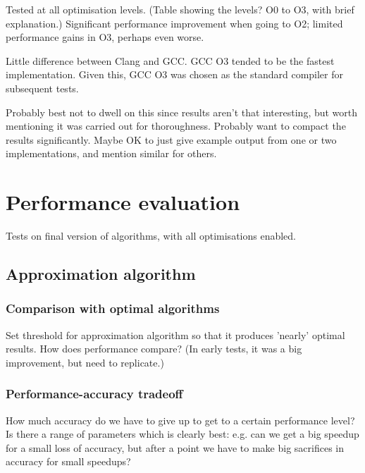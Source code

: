 Tested at all optimisation levels. (Table showing the levels? O0 to O3, with brief explanation.) Significant performance improvement when going to O2; limited performance gains in O3, perhaps even worse.

Little difference between Clang and GCC. GCC O3 tended to be the fastest implementation. Given this, GCC O3 was chosen as the standard compiler for subsequent tests.

Probably best not to dwell on this since results aren't that interesting, but worth mentioning it was carried out for thoroughness. Probably want to compact the results significantly. Maybe OK to just give example output from one or two implementations, and mention similar for others.

\section{Performance evaluation}

Tests on final version of algorithms, with all optimisations enabled.

\subsection{Approximation algorithm} \label{sec:eval-approx}


\subsubsection{Comparison with optimal algorithms}

Set threshold for approximation algorithm so that it produces 'nearly' optimal results. How does performance compare? (In early tests, it was a big improvement, but need to replicate.)

\subsubsection{Performance-accuracy tradeoff}

How much accuracy do we have to give up to get to a certain performance level? Is there a range of parameters which is clearly best: e.g. can we get a big speedup for a small loss of accuracy, but after a point we have to make big sacrifices in accuracy for small speedups?

